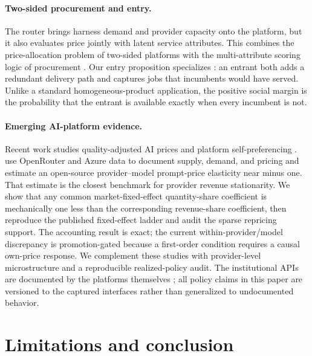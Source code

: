 \documentclass[11pt]{article}
\newcommand{\1}{\mathbf{1}}
\begin{document}
\paragraph{Two-sided procurement and entry.}
The router brings harness demand and provider capacity onto the platform, but it
also evaluates price jointly with latent service attributes.  This combines the
price-allocation problem of two-sided platforms \citep{rochettirole2003} with the
multi-attribute scoring logic of procurement \citep{che1993}.  Our entry
proposition specializes \citet{mankiw1986freeentry}: an entrant both adds a
redundant delivery path and captures jobs that incumbents would have served.
Unlike a standard homogeneous-product application, the positive social margin is
the probability that the entrant is available exactly when every incumbent is
not.

\paragraph{Emerging AI-platform evidence.}
Recent work studies quality-adjusted AI prices and platform self-preferencing
\cite{wang2026,zhang2026}.  \citet{demireretal2025} use OpenRouter and Azure
data to document supply, demand, and pricing and estimate an open-source
provider--model prompt-price elasticity near minus one.  That estimate is the
closest benchmark for provider revenue stationarity.  We show that any common
market-fixed-effect quantity-share coefficient is mechanically one less than the
corresponding revenue-share coefficient, then reproduce the published fixed-effect
ladder and audit the sparse repricing support.  The accounting result is exact;
the current within-provider/model discrepancy is promotion-gated because a
first-order condition requires a causal own-price response.  We complement these
studies with provider-level
microstructure and a reproducible realized-policy audit.  The institutional APIs
are documented by the platforms themselves \cite{openroutermetadata,
hfinferenceproviders2026}; all policy claims in this paper are versioned to the
captured interfaces rather than generalized to undocumented behavior.

\section{Limitations and conclusion}
\label{sec:conclusion}
\end{document}
